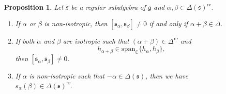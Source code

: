 \documentclass[11pt,reqno]{amsart}
\theoremstyle{plain}
\newtheorem*{prop}{Proposition}
\theoremstyle{definition}
\theoremstyle{remark}
\newcommand{\lie}[1]{\mathfrak{#1}}
\numberwithin{equation}{section}
\begin{document}
\begin{prop}\label{basiclem}
Let $\lie{s}$ be a regular subalgebra of $\lie{g}$ and $\alpha,\beta\in\Delta(\lie{s})^{\mathrm{re}}.$ 
\begin{enumerate}
    \item If $\alpha$ or $\beta$ is non-isotropic, then $[\lie{s}_\alpha,\lie{s}_\beta]\neq 0$ if and only if $\alpha+\beta\in\Delta.$ \vspace{0,1cm}
    \item If both $\alpha$ and $\beta$ are isotropic such that $(\alpha+\beta)\in\Delta^{\mathrm{re}}$ and
    \begin{equation}\label{isocond12}h_{\alpha+\beta}\in \mathrm{span}_{\mathbb{C}}\{h_{\alpha},h_{\beta}\},\end{equation} then $[\lie{s}_\alpha,\lie{s}_\beta]\neq 0.$\vspace{0,1cm}
    \item If $\alpha$ is non-isotropic such that $-\alpha\in \Delta(\lie{s})$, then we have $s_\alpha(\beta)\in\Delta(\lie s)^{\mathrm{re}}.$ 
\end{enumerate}
\end{prop}
\end{document}
